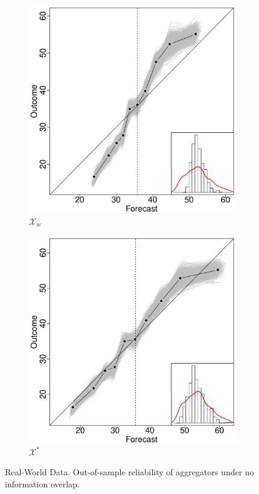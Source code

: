 \documentclass[12pt]{article}
\theoremstyle{definition}
\theoremstyle{definition}
\begin{document}
\begin{figure}[t]
\begin{subfigure}[b]{0.323\textwidth}
                \includegraphics[width=\textwidth]{IndependentOLP.pdf}
                \caption{$\mathcal{X}_w$}
                \label{fig:gull}
        \end{subfigure}%
         \begin{subfigure}[b]{0.323\textwidth}
                \includegraphics[width=\textwidth]{IndependentE-OLP.pdf}
                \caption{$\mathcal{X}^*$}
                \label{RelDiagramNoE}
             \end{subfigure}
          \caption{Real-World Data. Out-of-sample reliability of aggregators under no information overlap. }
           \label{RelDiagramNo}
\end{figure}
\end{document}
